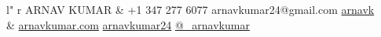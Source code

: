\documentclass[11pt, letter]{article}
\begin{document}
%
\begin{adjustbox}{width=1.03\textwidth,center}
\begin{tabular}{ l" r }
  {
    {\titlefont\fontsize{35pt}{22pt}\selectfont
      ARNAV KUMAR
    }
  }
&
\faMobilePhone {} +1 347 277 6077 \textbullet{}
\faEnvelope {} arnavkumar24@gmail.com \textbullet{}
\faGithub{ }\href{https://github.com/arnavk}{arnavk}
\\
&
\faExternalLink{ }\href{http://arnavkumar.com}{arnavkumar.com} \textbullet{}
\faLinkedin{ }\href{http://sg.linkedin.com/in/arnavkumar24/}{arnavkumar24} \textbullet{}
\faTwitter{ }\href{http://twitter.com/\_arnavkumar}{@\_arnavkumar}
\\
\end{tabular}
\end{adjustbox}

\begin{raggedright}
\vspace{5mm}


\end{raggedright}
\end{document}
